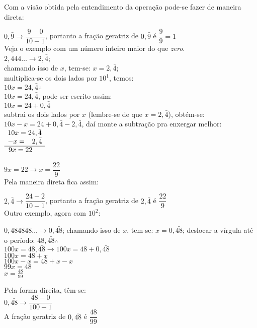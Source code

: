 	Com a visão obtida pela entendimento da operação pode-se fazer de maneira direta:
	
	$ 0,\bar{9} \longrightarrow \dfrac{9 - 0}{10-1} $, portanto a fração geratriz de $ 0,\bar{9} $ é $ \dfrac{9}{9} = 1 $ \\
	
	Veja o exemplo com um número inteiro maior do que \textit{zero}.\\
	
$ 2,444 \hdots \longrightarrow 2,\bar{4} $; \\
	chamando isso de $ x $, tem-se: $ x = 2,\bar{4} $; \\
	multiplica-se os dois lados por $ 10^1 $, temos: \\
	$ 10x = 24,\bar{4} \therefore $ \\
	$ 10x = 24,\bar{4} $, pode ser escrito assim: \\ $ 10x = 24 + 0,\bar{4} $\\
	subtrai os dois lados por $ x $ (lembre-se de que $ x = 2,\bar{4} $), obtém-se: \\ $ 10x - x = 24 + 0,\bar{4} - 2,\bar{4} $, daí monte a subtração pra enxergar melhor: \\
	$
		\begin{array}{r l}
		\multicolumn{2}{r}{10x = 24,\bar{4}} \\ 
		\multicolumn{1}{r}{-x = \;\;\: 2,\bar{4}} \\ \cline{1-2}
		\multicolumn{2}{r}{9x = 22 \;\;\:\;\;} \\
		\end{array}
	$
		
	$ 9x = 22 \longrightarrow x = \dfrac{22}{9} $ \\
	
	Pela maneira direta fica assim:
	
	$ 2,\bar{4} \longrightarrow \dfrac{24 - 2}{10-1} $, portanto a fração geratriz de $ 2,\bar{4} $ é $ \dfrac{22}{9} $ \\

Outro exemplo, agora com $ 10^2 $:
\begin{multicols}{2}
	\setlength{\columnseprule}{.5pt}
	$ 0,484848 \hdots  \longrightarrow 0,\bar{48} $;
	chamando isso de $ x $, tem-se: $ x = 0,\bar{48} $;
	deslocar a vírgula até o período: $ 48,\bar{48} \therefore $ \\
	$ 100x = 48,\bar{48} \longrightarrow 100x = 48 + 0,\bar{48} $\\
	$ 100x = 48 + x $ \\
	$ 100x - x = 48 + x - x $ \\
	$ 99x = 48 $ \\
	$ x = \frac{48}{99} $
	
	\columnbreak
	Pela forma direita, têm-se:\\
	
	$ 0,\bar{48} \longrightarrow \dfrac{48 - 0}{100-1} $\\
	A fração geratriz de $ 0,\bar{48} $ é $ \dfrac{48}{99} $
	
\end{multicols}

